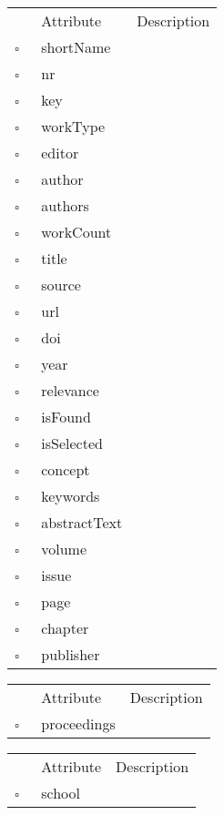 \begin{table}
\caption{OtherWork  }

\begin{longtable}{llp{8cm}}
& Attribute & Description \\
$\square$\ & shortName &  \\
$\square$\ & nr &  \\
$\square$\ & key &  \\
$\square$\ & workType &  \\
$\square$\ & editor &  \\
$\square$\ & author &  \\
$\square$\ & authors &  \\
$\square$\ & workCount &  \\
$\square$\ & title &  \\
$\square$\ & source &  \\
$\square$\ & url &  \\
$\square$\ & doi &  \\
$\square$\ & year &  \\
$\square$\ & relevance &  \\
$\square$\ & isFound &  \\
$\square$\ & isSelected &  \\
$\square$\ & concept &  \\
$\square$\ & keywords &  \\
$\square$\ & abstractText &  \\
$\square$\ & volume &  \\
$\square$\ & issue &  \\
$\square$\ & page &  \\
$\square$\ & chapter &  \\
$\square$\ & publisher &  \\
\end{longtable}
\label{attr:OtherWork}
\end{table}

\begin{table}
\caption{Paper  }

\begin{longtable}{llp{8cm}}
& Attribute & Description \\
$\square$\ & proceedings &  \\
\end{longtable}
\label{attr:Paper}
\end{table}

\clearpage
\begin{table}
\caption{PhDThesis  }

\begin{longtable}{llp{8cm}}
& Attribute & Description \\
$\square$\ & school &  \\
\end{longtable}
\label{attr:PhDThesis}
\end{table}

